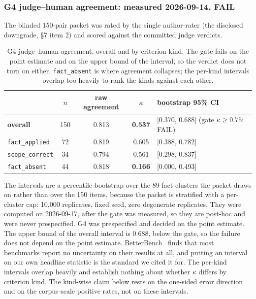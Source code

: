 \documentclass[11pt]{article}
\newcommand{\code}[1]{\texttt{\small #1}}
\begin{document}
\subsubsection*{G4 judge--human agreement: measured 2026-09-14, FAIL}

The blinded 150-pair packet was rated by the single author-rater (the disclosed
downgrade, \S7 item 2) and scored against the committed judge verdicts.

\begin{table}[htb]
\centering\small
\caption{G4 judge--human agreement, overall and by criterion kind. The gate fails
on the point estimate and on the upper bound of the interval, so the verdict does
not turn on either. \code{fact\_absent} is where agreement collapses; the
per-kind intervals overlap too heavily to rank the kinds against each other.}
\label{tab:g4}
\begin{tabular}{lcccl}
\toprule
 & $n$ & raw agreement & $\kappa$ & bootstrap 95\% CI\\
\midrule
\textbf{overall} & 150 & 0.813 & \textbf{0.537} & [0.370, 0.688] (gate $\kappa \geq 0.75$: FAIL)\\
\code{fact\_applied} & 72 & 0.819 & 0.605 & [0.388, 0.782]\\
\code{scope\_correct} & 34 & 0.794 & 0.561 & [0.298, 0.837]\\
\code{fact\_absent} & 44 & 0.818 & \textbf{0.166} & [0.000, 0.493]\\
\bottomrule
\end{tabular}
\end{table}

The intervals are a percentile bootstrap over the 89 fact clusters the packet
draws on rather than over the 150 items, because the packet is stratified with a
per-cluster cap: 10{,}000 replicates, fixed seed, zero degenerate replicates.
They were computed on 2026-09-17, after the gate was measured, so they are
post-hoc and were never prespecified. G4 was prespecified and decided on the
point estimate. The upper bound of the overall interval is 0.688, below the gate,
so the failure does not depend on the point estimate.
BetterBench~\cite{betterbench} finds that most benchmarks report no uncertainty
on their results at all, and putting an interval on our own headline statistic is
the standard we cited it for. The per-kind intervals overlap heavily and establish
nothing about whether $\kappa$ differs by criterion kind. The kind-wise claim
below rests on the one-sided error direction and on the corpus-scale positive
rates, not on these intervals.
\end{document}
